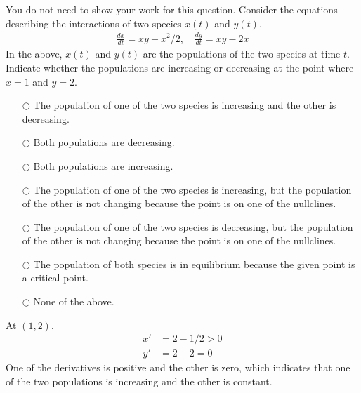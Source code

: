 \ifnum {}
\question[1] You do not need to show your work for this question. Consider the equations describing the interactions of two species $x(t)$ and $y(t)$.
\begin{align}
    \frac{dx}{dt} = xy-x^2/2, \quad \frac{dy}{dt} = xy-2x
\end{align}
In the above, $x(t)$ and $y(t)$ are the populations of the two species at time $t$. Indicate whether the populations are increasing or decreasing at the point where $x=1$ and $y=2$. 
\begin{itemize}
    \item[$\bigcirc$] The population of one of the two species is increasing and the other is decreasing. 
    \item[$\bigcirc$]Both populations are decreasing.
    \item[$\bigcirc$]Both populations are increasing.
    \item[$\bigcirc$]The population of one of the two species is increasing, but the population of the other is not changing because the point is on one of the nullclines. 
    \item[$\bigcirc$]The population of one of the two species is decreasing, but the population of the other is not changing because the point is on one of the nullclines. 
    \item[$\bigcirc$]The population of both species is in equilibrium because the given point is a critical point.
    \item[$\bigcirc$]None of the above.
\end{itemize}
\ifnum {} {\color{DarkBlue}
At $(1,2)$, 
\begin{align}
    x' &= 2 - 1/2 > 0\\
    y' &= 2-2 = 0 
\end{align}
One of the derivatives is positive and the other is zero, which indicates that one of the two populations is increasing and the other is constant. 
} 
\else 
\vspace{0.5cm}
\fi    
\fi 